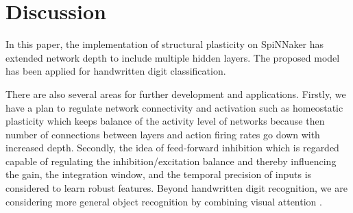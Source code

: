 \documentclass[letterpaper, 10 pt, conference]{ieeeconf}  %
\begin{document}
\section{Discussion}
% 
In this paper, the implementation of structural plasticity on SpiNNaker has extended network depth to include multiple hidden layers. 
The proposed model has been applied for handwritten digit classification. 

There are also several areas for further development and applications.
Firstly, we have a plan to regulate network connectivity and activation  such as homeostatic plasticity \cite{Tien2018} which keeps balance of the activity level of networks because then number of connections between layers and action firing rates go down with increased depth. 
Secondly, the idea of feed-forward inhibition which is regarded capable of regulating the inhibition/excitation balance and thereby influencing the gain, the integration window, and the temporal precision of inputs \cite{DSouza2016} is considered to learn robust features. 
Beyond handwritten digit recognition, we are considering more general object recognition by combining visual attention \cite{Rea2013}.

%
%





\end{document}
